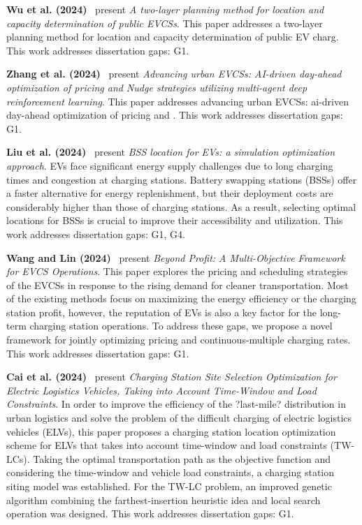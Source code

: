 \documentclass[letterpaper, 12pt, oneside, doublespacing]{Thesis}
\begin{document}
\noindent \textbf{Wu et al. (2024)}~\cite{allocate_electric_2024} present \textit{A two-layer planning method for location and capacity determination of public EVCSs}. This paper addresses a two-layer planning method for location and capacity determination of public EV charg. This work addresses dissertation gaps: G1.



\noindent \textbf{Zhang et al. (2024)}~\cite{a_multi-objective_2024} present \textit{Advancing urban EVCSs: AI-driven day-ahead optimization of pricing and Nudge strategies utilizing multi-agent deep reinforcement learning}. This paper addresses advancing urban EVCSs: ai-driven day-ahead optimization of pricing and . This work addresses dissertation gaps: G1.



\noindent \textbf{Liu et al. (2024)}~\cite{battery_swapping_2024} present \textit{BSS location for EVs: a simulation optimization approach}. EVs face significant energy supply challenges due to long charging times and congestion at charging stations. Battery swapping stations (BSSs) offer a faster alternative for energy replenishment, but their deployment costs are considerably higher than those of charging stations. As a result, selecting optimal locations for BSSs is crucial to improve their accessibility and utilization. This work addresses dissertation gaps: G1, G4.



\noindent \textbf{Wang and Lin (2024)}~\cite{planning_of_2024} present \textit{Beyond Profit: A Multi-Objective Framework for EVCS Operations}. This paper explores the pricing and scheduling strategies of the EVCSs in response to the rising demand for cleaner transportation. Most of the existing methods focus on maximizing the energy efficiency or the charging station profit, however, the reputation of EVs is also a key factor for the long-term charging station operations. To address these gaps, we propose a novel framework for jointly optimizing pricing and continuous-multiple charging rates. This work addresses dissertation gaps: G1.



\noindent \textbf{Cai et al. (2024)}~\cite{charging_station_2024} present \textit{Charging Station Site Selection Optimization for Electric Logistics Vehicles, Taking into Account Time-Window and Load Constraints}. In order to improve the efficiency of the ?last-mile? distribution in urban logistics and solve the problem of the difficult charging of electric logistics vehicles (ELVs), this paper proposes a charging station location optimization scheme for ELVs that takes into account time-window and load constraints (TW-LCs). Taking the optimal transportation path as the objective function and considering the time-window and vehicle load constraints, a charging station siting model was established. For the TW-LC problem, an improved genetic algorithm combining the farthest-insertion heuristic idea and local search operation was designed. This work addresses dissertation gaps: G1.
\end{document}

